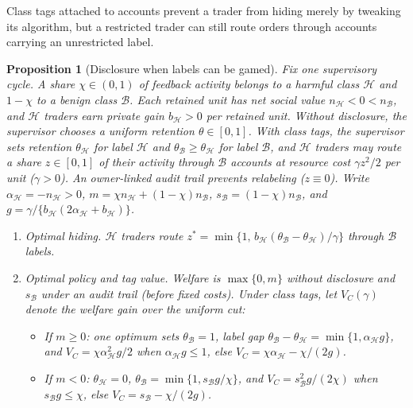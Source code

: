 \documentclass[11pt,letterpaper]{article}
\newtheorem{proposition}[theorem]{Proposition}
\theoremstyle{definition}
\begin{document}
Class tags attached to accounts prevent a trader from hiding merely by tweaking its algorithm, but a restricted trader can still route orders through accounts carrying an unrestricted label.

\begin{proposition}[Disclosure when labels can be gamed]\label{n:relabel}
Fix one supervisory cycle. A share $\chi \in (0, 1)$ of feedback activity belongs to a harmful class $\mathcal{H}$ and $1 - \chi$ to a benign class $\mathcal{B}$. Each retained unit has net social value $n_{\mathcal{H}} < 0 < n_{\mathcal{B}}$, and $\mathcal{H}$ traders earn private gain $b_{\mathcal{H}} > 0$ per retained unit. Without disclosure, the supervisor chooses a uniform retention $\theta \in [0, 1]$. With class tags, the supervisor sets retention $\theta_{\mathcal{H}}$ for label $\mathcal{H}$ and $\theta_{\mathcal{B}} \ge \theta_{\mathcal{H}}$ for label $\mathcal{B}$, and $\mathcal{H}$ traders may route a share $z \in [0, 1]$ of their activity through $\mathcal{B}$ accounts at resource cost $\gamma z^2 / 2$ per unit ($\gamma > 0$). An owner-linked audit trail prevents relabeling ($z \equiv 0$). Write $\alpha_{\mathcal{H}} = -n_{\mathcal{H}} > 0$, $m = \chi n_{\mathcal{H}} + (1 - \chi) n_{\mathcal{B}}$, $s_{\mathcal{B}} = (1 - \chi) n_{\mathcal{B}}$, and $g = \gamma / \{b_{\mathcal{H}}(2\alpha_{\mathcal{H}} + b_{\mathcal{H}})\}$.
\begin{enumerate}
  \item[(i)] \emph{Optimal hiding.} $\mathcal{H}$ traders route $z^* = \min\{1,\, b_{\mathcal{H}}(\theta_{\mathcal{B}} - \theta_{\mathcal{H}})/\gamma\}$ through $\mathcal{B}$ labels.
  \item[(ii)] \emph{Optimal policy and tag value.} Welfare is $\max\{0, m\}$ without disclosure and $s_{\mathcal{B}}$ under an audit trail (before fixed costs). Under class tags, let $V_C(\gamma)$ denote the welfare gain over the uniform cut:
  \begin{itemize}
    \item If $m \ge 0$: one optimum sets $\theta_{\mathcal{B}} = 1$, label gap $\theta_{\mathcal{B}} - \theta_{\mathcal{H}} = \min\{1, \alpha_{\mathcal{H}} g\}$, and $V_C = \chi \alpha_{\mathcal{H}}^2 g / 2$ when $\alpha_{\mathcal{H}} g \le 1$, else $V_C = \chi \alpha_{\mathcal{H}} - \chi / (2g)$.
    \item If $m < 0$: $\theta_{\mathcal{H}} = 0$, $\theta_{\mathcal{B}} = \min\{1, s_{\mathcal{B}} g / \chi\}$, and $V_C = s_{\mathcal{B}}^2 g / (2\chi)$ when $s_{\mathcal{B}} g \le \chi$, else $V_C = s_{\mathcal{B}} - \chi / (2g)$.

\end{itemize}
\end{enumerate}
\end{proposition}
\end{document}
